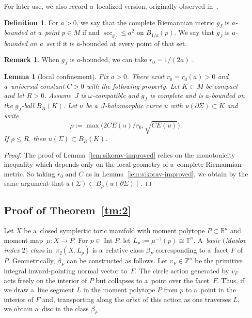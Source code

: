 \documentclass[10pt,a4paper]{amsart}
\numberwithin{equation}{section}
\newcommand{\bR}{{\mathbb R}}
\newcommand{\bT}{{\mathbb T}}
\DeclareMathOperator{\inj}{inj}
\DeclareMathOperator{\Sec}{sec}
\newtheorem{lm}[Theorem]{Lemma}
\theoremstyle{definition}
\newtheorem{df}[Theorem]{Definition}
\newtheorem{rem}[Theorem]{Remark}
\begin{document}
For later use, we also record a~localized version, originally observed in~\cite{GromanFloerOpen}.
\begin{df}\label{df:a-bounded}
 For $a>0$, we say that the complete Riemannian metric $g_J$ is \emph{$a$-bounded at a~point} $p\in M$ if \smash{$\inj_{g_J}(p)\ge \frac{1}{a}$} and $\Sec_{g_J}\le a^{2}$ on $B_{1/a}(p)$. We say that $g_J$ is \emph{$a$-bounded on a~set} if it is $a$-bounded at every point of that set.
\end{df}
\begin{rem}
 When $g_J$ is $a$-bounded, we can take $r_0=1/(2a)$ \cite[Theorem 4.4.1 and Remark~4.4.3]{McDuffSalamonJHol}.
\end{rem}

\begin{lm}[local confinement]\label{lem:local-confinement}
Fix $a>0$. There exist $r_0=r_0(a)>0$ and a~universal constant $C>0$ with the following property. Let $K\subset M$ be compact and let $R>0$.
Assume~$J$ is $\omega$-compatible and $g_J$ is complete and is $a$-bounded on the $g_J$-ball $B_{R}(K)$.
Let $u$ be a~$J$-holomorphic curve $u$ with $u(\partial\Sigma)\subset K$ and write
\[
\rho:=\max\bigl(2CE(u)/r_0,\sqrt{CE(u)}\bigr).
\]
If $\rho\le R$, then $u(\Sigma)\subset B_R(K)$.
\end{lm}
\begin{proof}
The proof of Lemma~\ref{lem:sikorav-improved} relies on the monotonicity inequality which depends only on the local geometry of a~complete Riemannian metric. So taking $r_0$ and $C$ as in Lemma~\ref{lem:sikorav-improved}, we obtain by the same argument that
$
u(\Sigma)\subset B_{\rho}(u(\partial\Sigma))
$.
\end{proof}

\subsection{Proof of Theorem~\ref{tm:2}}

Let $X$ be a~closed symplectic toric manifold with moment polytope $P\subset \bR^n$ and moment map~${\mu\colon X\to P}$.
For $p\in \operatorname{Int} P$, let $L_p:=\mu^{-1}(p)\cong \bT^n$. A~\emph{basic $($Maslov index $2)$ class} in~$\pi_2(X,L_p)$ is a~relative class $\beta_F$ corresponding to a~facet $F$ of $P$.
Geometrically, $\beta_F$ can be constructed as follows. Let $v_F \in \mathbb{Z}^n$ be the primitive integral inward-pointing normal vector to~$F$. The circle action generated by $v_F$ acts freely on the interior of $P$ but collapses to a~point over the facet~$F$. Thus, if we draw a~line segment $L$ in the moment polytope $P$ from $p$ to a~point in the interior of $F$ and, transporting along the orbit of this action as one traverses $L$, we obtain a~disc in the class $\beta_F$.
\end{document}
